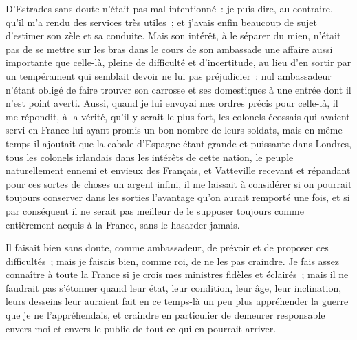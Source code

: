 \documentclass[french,twoside]{book} %
\begin{document}
D’Estrades sans doute n’était pas mal intentionné : je puis dire, au contraire, qu’il m’a rendu des services très utiles ; et j’avais enfin beaucoup de sujet d’estimer son zèle et sa conduite. Mais son intérêt, à le séparer du mien, n’était pas de se mettre sur les bras dans le cours de son ambassade une affaire aussi importante que celle-là, pleine de difficulté et d’incertitude, au lieu d’en sortir par un tempérament qui semblait devoir ne lui pas préjudicier : nul ambassadeur n’étant obligé de faire trouver son carrosse et ses domestiques à une entrée dont il n’est point averti. Aussi, quand je lui envoyai mes ordres précis pour celle-là, il me répondit, à la vérité, qu’il y serait le plus fort, les colonels écossais qui avaient servi en France lui ayant promis un bon nombre de leurs soldats, mais en même temps il ajoutait que la cabale d’Espagne étant grande et puissante dans Londres, tous les colonels irlandais dans les intérêts de cette nation, le peuple naturellement ennemi et envieux des Français, et Vatteville recevant et répandant pour ces sortes de choses un argent infini, il me laissait à considérer si on pourrait toujours conserver dans les sorties l’avantage qu’on aurait remporté une fois, et si par conséquent il ne serait pas meilleur de le supposer toujours comme entièrement acquis à la France, sans le hasarder jamais.\par
Il faisait bien sans doute, comme ambassadeur, de prévoir et de proposer ces difficultés ; mais je faisais bien, comme roi, de ne les pas craindre. Je fais assez connaître à toute la France si je crois mes ministres fidèles et éclairés ; mais il ne faudrait pas s’étonner quand leur état, leur condition, leur âge, leur inclination, leurs desseins leur auraient fait en ce temps-là un peu plus appréhender la guerre que je ne l’appréhendais, et craindre en particulier de demeurer responsable envers moi et envers le public de tout ce qui en pourrait arriver.\par
\end{document}
